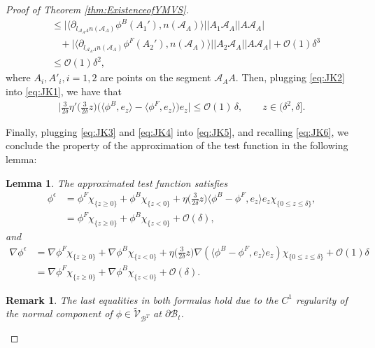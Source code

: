 \documentclass[11pt,twoside,reqno]{amsart}
\numberwithin{equation}{section}
\numberwithin{figure}{section}
\newtheorem{lemma}{Lemma}[section]
\newtheorem{remark}{Remark}[section]
\newcommand{\qnt}[1]{\left(#1\right)}
\begin{document}
\begin{proof}[Proof of Theorem \ref{thm:ExistenceofYMVS}]
\begin{equation}
\begin{aligned}
       &\leq \Big|\langle\partial_{l_{\mathcal{A}_AA}n(\mathcal{A}_A)}\phi^B(A_1'),n(\mathcal{A}_A)\rangle\Big|\Big|A_1\mathcal{A}_A\Big|\Big|A\mathcal{A}_A\Big|\\&~~~~+\Big|\langle\partial_{l_{\mathcal{A}_AA}n(\mathcal{A}_A)}\phi^F(A_2'),n(\mathcal{A}_A)\rangle\Big|\Big|A_2\mathcal{A}_A\Big|\Big|A\mathcal{A}_A\Big|+\mathcal{O}(1)\delta^3\\&\leq\mathcal{O}(1)\delta^2,
    \end{aligned}
\end{equation}
where $A_i, A'_i, i=1,2$ are points on the segment $\mathcal{A}_AA.$ Then, plugging \eqref{eq:JK2} into \eqref{eq:JK1}, we have that 
\begin{equation}\label{eq:JK4}
    \begin{aligned}
        \big|\frac{3}{2\delta}\eta'\!\Big(\tfrac{3}{2\delta}z\Big)\Big(\langle\phi^B,e_z\rangle -\langle\phi^F,e_z\rangle\Big)e_z\big|\leq \mathcal{O}(1)\,\delta, \qquad z\in(\delta^2,\delta]. 
    \end{aligned}
\end{equation}

Finally, plugging \eqref{eq:JK3} and \eqref{eq:JK4} into \eqref{eq:JK5}, and recalling \eqref{eq:JK6}, we conclude the property of the approximation of the test function in the following lemma:  
\begin{lemma}\label{lem:JJ1}
 The approximated test function satisfies  
   \begin{equation}
       \begin{aligned}
           \phi^{\epsilon}&=\phi^F\chi_{\{z\ge0\}}+\phi^B\chi_{\{z<0\}}+\eta\!\Big(\frac{3}{2\delta}z\Big)\langle\phi^B-\phi^F,e_z\rangle e_z \chi_{\{0\le z\le\delta\}},\\&=\phi^F\chi_{\{z\ge0\}}+\phi^B\chi_{\{z<0\}}+\mathcal{O}(\delta),
       \end{aligned}
   \end{equation}
   and 
\begin{equation}
    \begin{aligned}
    \nabla\phi^\epsilon &=\nabla\phi^F\chi_{\{z\ge0\}}+\nabla\phi^B\chi_{\{z<0\}}+\eta\!\Big(\frac{3}{2\delta}z\Big)\nabla\qnt{\langle\phi^B-\phi^F,e_z\rangle e_z} \chi_{\{0\le z\le\delta\}}+\mathcal{O}(1)\delta\\&=\nabla\phi^F\chi_{\{z\ge0\}}+\nabla\phi^B\chi_{\{z<0\}}+\mathcal{O}(\delta).    
    \end{aligned}
\end{equation}
\end{lemma}
\begin{remark}
The last equalities in both formulas hold due to the $C^1$ regularity of the normal component of $\phi\in\tilde{\mathcal{V}}_{\mathcal{B}^T}$ at $\partial\mathcal{B}_t$. 
\end{remark}


\end{proof}
\end{document}

